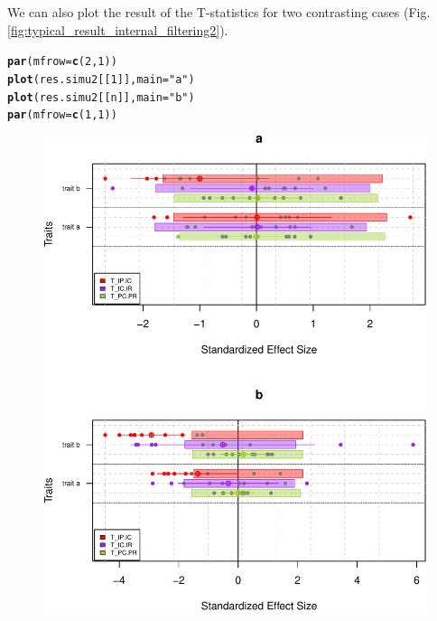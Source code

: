 \documentclass[12pt]{article}\usepackage[]{graphicx}\usepackage[]{color}
\makeatletter
\def\maxwidth{ %
  \ifdim\Gin@nat@width>\linewidth
    \linewidth
  \else
    \Gin@nat@width
  \fi
}
\newcommand{\hlnum}[1]{\textcolor[rgb]{0.686,0.059,0.569}{#1}}%
\newcommand{\hlstr}[1]{\textcolor[rgb]{0.192,0.494,0.8}{#1}}%
\newcommand{\hlstd}[1]{\textcolor[rgb]{0.345,0.345,0.345}{#1}}%
\newcommand{\hlkwc}[1]{\textcolor[rgb]{0.333,0.667,0.333}{#1}}%
\newcommand{\hlkwd}[1]{\textcolor[rgb]{0.737,0.353,0.396}{\textbf{#1}}}%
\newenvironment{kframe}{%
 \def\at@end@of@kframe{}%
 \ifinner\ifhmode%
  \def\at@end@of@kframe{\end{minipage}}%
  \begin{minipage}{\columnwidth}%
 \fi\fi%
 \def\FrameCommand##1{\hskip\@totalleftmargin \hskip-\fboxsep
 \colorbox{shadecolor}{##1}\hskip-\fboxsep
     \hskip-\linewidth \hskip-\@totalleftmargin \hskip\columnwidth}%
 \MakeFramed {\advance\hsize-\width
   \@totalleftmargin\z@ \linewidth\hsize
   \@setminipage}}%
 {\par\unskip\endMakeFramed%
 \at@end@of@kframe}
\newenvironment{knitrout}{}{} %
\makeatother
\begin{document}
\begin{landscape}
We can also plot the result of the T-statistics for two contrasting cases (Fig. \ref{fig:typical_result_internal_filtering2}).

\begin{knitrout}\small
{}\color{fgcolor}\begin{kframe}
\begin{alltt}
\hlkwd{par}\hlstd{(}\hlkwc{mfrow}\hlstd{=}\hlkwd{c}\hlstd{(}\hlnum{2}\hlstd{,} \hlnum{1}\hlstd{))}
\hlkwd{plot}\hlstd{(res.simu2[[}\hlnum{1}\hlstd{]],} \hlkwc{main}\hlstd{=}\hlstr{"a"}\hlstd{)}
\hlkwd{plot}\hlstd{(res.simu2[[n]],} \hlkwc{main}\hlstd{=}\hlstr{"b"}\hlstd{)}
\hlkwd{par}\hlstd{(}\hlkwc{mfrow}\hlstd{=}\hlkwd{c}\hlstd{(}\hlnum{1}\hlstd{,} \hlnum{1}\hlstd{))}
\end{alltt}
\end{kframe}\begin{figure}

{\centering \includegraphics[width=\maxwidth]{figure/typical_result_internal_filtering2-1} 

}
\end{figure}
\end{knitrout}
\end{landscape}
\end{document}
